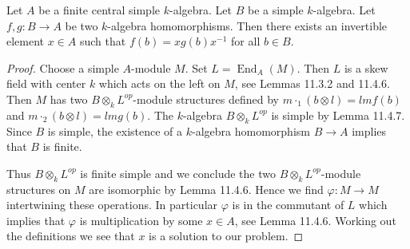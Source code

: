 \begin{theorem}
Let $A$ be a finite central simple $k$-algebra. Let $B$ be a simple $k$-algebra. Let $f,g:B\to A$ be two $k$-algebra homomorphisms. Then there exists an invertible element $x\in A$ such that $f(b)=xg(b)x^{-1}$ for all $b\in B$.
\end{theorem}
\begin{proof}
Choose a simple $A$-module $M$. Set $L=\operatorname{End}_A(M)$. Then $L$ is a skew field with center $k$ which acts on the left on $M$, see Lemmas 11.3.2 and 11.4.6. Then $M$ has two $B\otimes_k L^{op}$-module structures defined by $m\cdot_1(b\otimes l)=lmf(b)$ and $m\cdot_2(b\otimes l)=lmg(b)$. The $k$-algebra $B\otimes_k L^{op}$ is simple by Lemma 11.4.7. Since $B$ is simple, the existence of a $k$-algebra homomorphism $B\to A$ implies that $B$ is finite.

Thus $B\otimes_k L^{op}$ is finite simple and we conclude the two $B\otimes_k L^{op}$-module structures on $M$ are isomorphic by Lemma 11.4.6. Hence we find $\varphi:M\to M$ intertwining these operations. In particular $\varphi$ is in the commutant of $L$ which implies that $\varphi$ is multiplication by some $x\in A$, see Lemma 11.4.6. Working out the definitions we see that $x$ is a solution to our problem.
\end{proof}
